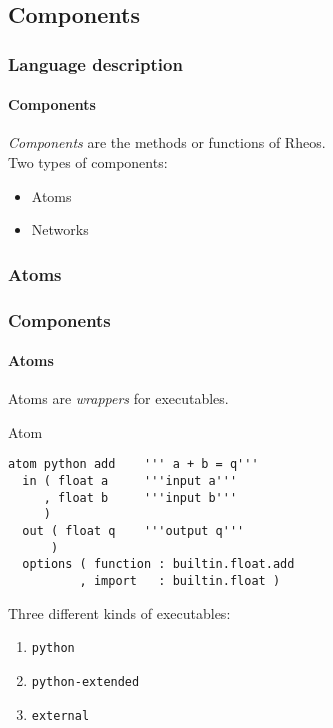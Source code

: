 \documentclass[10pt]{beamer}
\begin{document}
\subsection*{Components}
\begin{frame}
\frametitle{Language description}
\framesubtitle{Components}

\emph{Components} are the methods or functions of Rheos.\\
\vspace{10pt}
\pause
Two types of components:
\begin{itemize}
\pause
\item Atoms
\pause
\item Networks
\end{itemize}

\end{frame}


\subsubsection*{Atoms}
\begin{frame}[fragile]
\frametitle{Components}
\framesubtitle{Atoms}

Atoms are \emph{wrappers} for executables.

\pause
\begin{block}{Atom}
\begin{verbatim}
atom python add    ''' a + b = q'''
  in ( float a     '''input a'''
     , float b     '''input b'''
     )
  out ( float q    '''output q'''
      )
  options ( function : builtin.float.add
          , import   : builtin.float )
\end{verbatim}
\end{block}

\pause
Three different kinds of executables:
\begin{enumerate}
\pause
\item \verb|python|
\pause
\item \verb|python-extended|
\pause
\item \verb|external|
\end{enumerate}


\end{frame}


\end{document}
